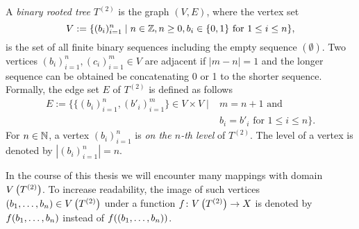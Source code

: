 
\begin{defin}
A \emph{binary rooted tree} $T^{(2)}$ is the graph $(V,E)$, where the vertex set 
\begin{equation*}
V:=\lbrace (b_i)_{i=1}^n\mid n\in \operatorname{\mathbb{Z}}, n\geq 0, b_i\in\lbrace 0,1\rbrace\text{ for }1\leq i\leq n\rbrace,
\end{equation*}
is the set of all finite binary sequences including the empty sequence $(\emptyset)$. Two vertices $(b_i)_{i=1}^n,(c_i)_{i=1}^m\in V$ are adjacent if $|m-n|=1$ and the longer sequence can be obtained be concatenating 0 or 1 to the shorter sequence. Formally, the edge set $E$ of $T^{(2)}$ is defined as follows
\begin{align*}
E:=\lbrace \lbrace(b_i)_{i=1}^n,(b'_i)_{i=1}^m\rbrace\in V\times V\mid& m=n+1\text{ and }\\
& b_i=b'_i\text{ for } 1\leq i\leq n\rbrace.
\end{align*}
For $n\in\operatorname{\mathbb{N}}$, a vertex $(b_i)_{i=1}^n$ is \emph{on the $n$-th level} of $T^{(2)}$. The level of a vertex  is denoted by $|(b_i)_{i=1}^n|=n.$
\end{defin}
In the course of this thesis we will encounter many mappings with domain $V\left(T^{(2)}\right)$. To increase readability, the image of such vertices $(b_{1},\ldots,b_{n})\in V\left(T^{(2)}\right)$ under a function $f\colon V\left(T^{(2)}\right)\to X$ is denoted by $f(b_{1},\ldots,b_{n})$ instead of $f((b_{1},\ldots,b_{n}))$.


